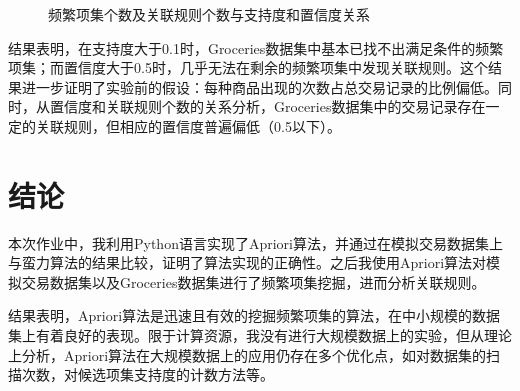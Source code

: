 \documentclass[12pt,a4paper]{article}
\theoremstyle{definition}
\begin{document}
\begin{figure}[H]
	\centering
	\caption{频繁项集个数及关联规则个数与支持度和置信度关系}
	\label{fig:apriori}
\end{figure}

结果表明，在支持度大于0.1时，Groceries数据集中基本已找不出满足条件的频繁项集；而置信度大于0.5时，几乎无法在剩余的频繁项集中发现关联规则。这个结果进一步证明了实验前的假设：每种商品出现的次数占总交易记录的比例偏低。同时，从置信度和关联规则个数的关系分析，Groceries数据集中的交易记录存在一定的关联规则，但相应的置信度普遍偏低（0.5以下）。

\section{结论}

本次作业中，我利用Python语言实现了Apriori算法，并通过在模拟交易数据集上与蛮力算法的结果比较，证明了算法实现的正确性。之后我使用Apriori算法对模拟交易数据集以及Groceries数据集进行了频繁项集挖掘，进而分析关联规则。

\vspace{0.01\linewidth}
结果表明，Apriori算法是迅速且有效的挖掘频繁项集的算法，在中小规模的数据集上有着良好的表现。限于计算资源，我没有进行大规模数据上的实验，但从理论上分析，Apriori算法在大规模数据上的应用仍存在多个优化点，如对数据集的扫描次数，对候选项集支持度的计数方法等。
\end{document}
